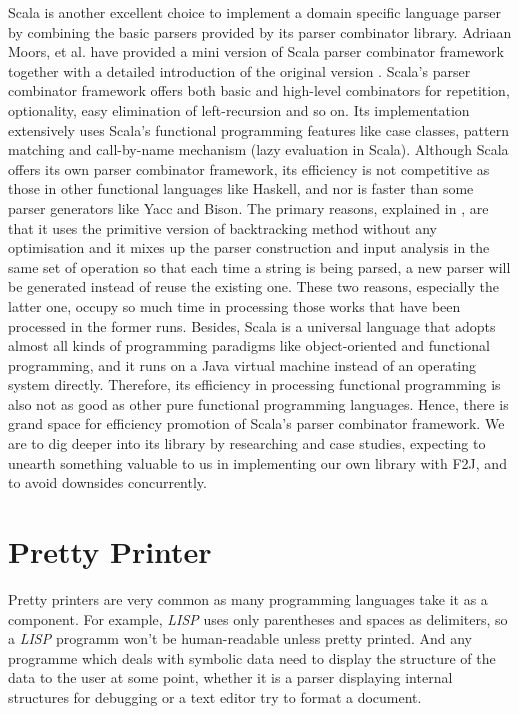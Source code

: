 Scala is another excellent choice to implement a domain specific language parser by combining the basic parsers provided by its parser combinator library. Adriaan Moors, et al. have provided a mini version of Scala parser combinator framework together with a detailed introduction of the original version \cite{Moors:2008}. Scala's parser combinator framework offers both basic and high-level combinators for repetition, optionality, easy elimination of left-recursion and so on. Its implementation extensively uses Scala's functional programming features like case classes, pattern matching and call-by-name mechanism (lazy evaluation in Scala). Although Scala offers its own parser combinator framework, its efficiency is not competitive as those in other functional languages like Haskell, and nor is faster than some parser generators like Yacc and Bison. The primary reasons, explained in \cite{Scala:2008}, are that it uses the primitive version of backtracking method without any optimisation and it mixes up the parser construction and input analysis in the same set of operation so that each time a string is being parsed, a new parser will be generated instead of reuse the existing one. These two reasons, especially the latter one, occupy so much time in processing those works that have been processed in the former runs.  Besides, Scala is a universal language that adopts almost all kinds of programming paradigms like object-oriented and functional programming, and it runs on a Java virtual machine instead of an operating system directly. Therefore, its efficiency in processing functional programming is also not as good as other pure functional programming languages. Hence, there is grand space for efficiency promotion of Scala's parser combinator framework. We are to dig deeper into its library by researching and case studies, expecting to unearth something valuable to us in implementing our own library with F2J, and to avoid downsides concurrently.

\section{Pretty Printer}

Pretty printers are very common as many programming languages take it as a component. For example, \textit{LISP} uses only parentheses and spaces as delimiters, so a \textit{LISP} programm won't be human-readable unless pretty printed. And any programme which deals with symbolic data need to display the structure of the data to the user at some point, whether it is a parser displaying internal structures for debugging or a text editor try to format a document.

